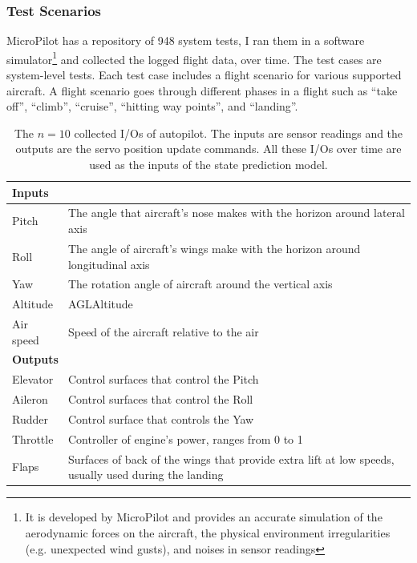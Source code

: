 \subsubsection{Test Scenarios}\label{sec:mp_test_scenarios}
MicroPilot has a repository of 948 system tests, I ran them in a software simulator\footnote{It is developed by MicroPilot and provides an accurate simulation of the aerodynamic forces on the aircraft, the physical environment irregularities (e.g. unexpected wind gusts), and noises in sensor readings} and collected the logged flight data, over time. 
The test cases are system-level tests. Each test case includes a flight scenario for various supported aircraft. A flight scenario goes through different phases in a flight such as ``take off'', ``climb'', ``cruise'', ``hitting way points'', and ``landing''.
\begin{table}
    \caption{The $n=10$ collected I/Os of autopilot. The inputs are sensor readings and the outputs are the servo position update commands. All these I/Os over time are used as the inputs of the state prediction model.}
    \label{tab:in_outs}
    \centering
\begin{tabularx}{\columnwidth}{lX}
                                                                                                                    \toprule
\multicolumn{2}{l}{\textbf{Inputs}}                                                                              \\ \midrule
Pitch     & The angle that aircraft's nose makes with the horizon around lateral axis                            \\ 
Roll      & The angle of aircraft's wings make with the horizon around longitudinal axis                         \\ 
Yaw       & The rotation angle of aircraft around the vertical axis                                              \\ 
Altitude  & AGL\footnotemark Altitude                                                                            \\ 
Air speed & Speed of the aircraft relative to the air                                                            \\ \midrule
\multicolumn{2}{l}{\textbf{Outputs}}                                                                             \\ \midrule
Elevator  & Control surfaces that control the Pitch                                                              \\ 
Aileron   & Control surfaces that control the Roll                                                               \\ 
Rudder    & Control surface that controls the Yaw                                                                \\ 
Throttle  & Controller of engine's power, ranges from 0 to 1                                                     \\ 
Flaps     & Surfaces of back of the wings that provide extra lift at low speeds, usually used during the landing \\ \bottomrule
\end{tabularx}
\end{table}
